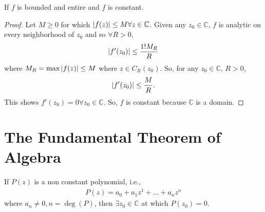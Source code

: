 \documentclass{article}
\theoremstyle{definition}
\newcommand{\f}[2]{\frac{#1}{#2}}
\newcommand{\C}{\mathbb{C}}
\begin{document}
If $f$ is bounded and entire and $f$ is constant. 

\begin{proof}
	Let $M \geq 0$ for which $\abs{f(z)} \leq M \forall z \in \C$. Given any $z_0 \in \C$, $f$ is analytic on every neighborhood of $z_0$ and so $\forall R > 0$,
	\begin{align}
	\abs{f'(z_0)} \leq \f{1! M_R}{R}
	\end{align}
	where $M_R = \max \abs{f(z)} \leq M$ where $z \in C_R(z_0)$. So, for any $z_0 \in \C$, $R > 0$,
	\begin{align}
	\abs{f'(z_0)} \leq \f{M}{R}.
	\end{align}
	This shows $f'(z_0) = 0 \forall z_0 \in \C$. So, $f$ is constant because $\C$ is a domain.  
\end{proof}



\section{The Fundamental Theorem of Algebra}

If $P(z)$ is a non constant polynomial, i.e., 
\begin{align}
P(z) = a_0 + a_1z^1 + \dots + a_n z^n
\end{align}
where $a_n \neq 0, n = \deg(P)$, then $\exists z_0 \in \C$ at which $P(z_0) = 0$. 
\end{document}
